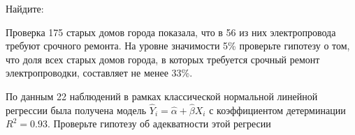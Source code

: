 \documentclass[addpoints, answers]{exam} %
\begin{document}
\begin{questions}
Найдите:
\question Проверка 175 старых домов города показала, что в 56 из них электропровода требуют срочного ремонта. На уровне значимости 5\% проверьте гипотезу о том, что доля всех старых домов города, в которых требуется срочный ремонт электропроводки, составляет не менее 33\%.\\
\item По данным 22 наблюдений в рамках классической нормальной линейной регрессии была получена модель $\hat{Y}_i=\hat{\alpha}+\hat{\beta}X_i$ с коэффициентом детерминации $R^2=0.93$. Проверьте гипотезу об адекватности этой регресии
\end{questions}
\end{document}

